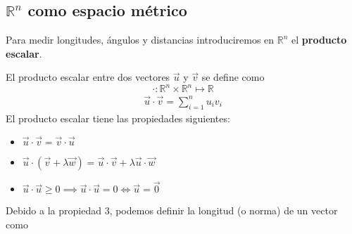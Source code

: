 \documentclass{../Calculo.tex}
\begin{document}
\subsection{$\mathbb{R}^{n}$ como espacio métrico}
Para medir longitudes, ángulos y distancias introduciremos en $\mathbb{R}^{n}$
el \textbf{producto escalar}.
\begin{defin}
	El producto escalar entre dos vectores $\vec{u}$ y $\vec{v}$ se define como
	\[
		\cdot : \mathbb{R}^{n} \times  \mathbb{R}^{n} \mapsto \mathbb{R}
	\]
	\begin{equation}
		\begin{split}
			\vec{u} \cdot  \vec{v} = \sum_{i=1}^{n} u_{i}v_{i}
		\end{split}
	\end{equation}
	El producto escalar tiene las propiedades siguientes:
	\begin{itemize}
		\item $\vec{u} \cdot  \vec{v} = \vec{v} \cdot \vec{u}$
		\item $\vec{u} \cdot (\vec{v}+\lambda\vec{w})= 
			\vec{u} \cdot \vec{v} + \lambda \vec{u} \cdot \vec{w}$
		\item $\vec{u} \cdot \vec{u} \geq 0 \implies \vec{u} \cdot \vec{u}=0
			\iff \vec{u} = \vec{0}$ 
	\end{itemize}
\end{defin}
Debido a la propiedad 3, podemos definir la longitud (o norma) de un vector como
\end{document}
